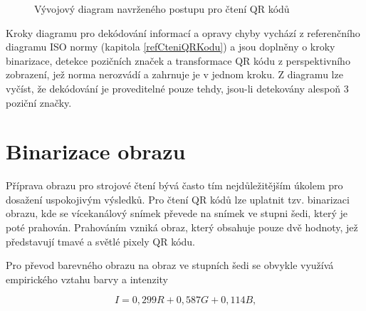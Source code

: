 \begin{figure}[H]
  \begin{center}
    \caption{Vývojový diagram navrženého postupu pro čtení QR kódů}
    \label{QRCodeReadingProcess}
  \end{center}
\end{figure}

Kroky diagramu pro dekódování informací a opravy chyby vychází z referenčního
diagramu ISO normy (kapitola \ref{refCteniQRKodu}) a jsou doplněny o kroky
binarizace, detekce pozičních značek a transformace QR kódu z perspektivního zobrazení, jež norma
nerozvádí a zahrnuje je v jednom kroku.
Z diagramu lze vyčíst, že dekódování je proveditelné pouze tehdy, jsou-li
detekovány alespoň 3 poziční značky.

\section{Binarizace obrazu}
\label{binarizaceObrazu}

Příprava obrazu pro strojové čtení bývá často tím nejdůležitějším úkolem pro
dosažení uspokojivým výsledků. Pro čtení QR kódů lze uplatnit tzv. binarizaci
obrazu, kde se vícekanálový snímek převede na snímek ve stupni šedi, který
je poté prahován. Prahováním vzniká obraz, který obsahuje pouze dvě hodnoty,
jež představují tmavé a světlé pixely QR kódu.

Pro převod barevného obrazu na obraz ve stupních šedi se obvykle využívá
empirického vztahu barvy a intenzity

\begin{equation}
  I = 0,299R + 0,587G + 0,114B\mbox{,}
\end{equation}

